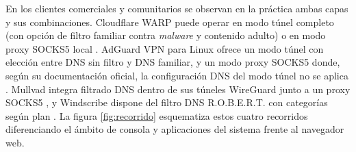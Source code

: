 \documentclass[10pt,a4paper]{article}
\begin{document}
En los clientes comerciales y comunitarios se observan en la práctica ambas capas y sus combinaciones. Cloudflare WARP puede operar en modo túnel completo (con opción de filtro familiar contra \emph{malware} y contenido adulto) o en modo proxy SOCKS5 local \cite{warpcliente,warpmodos}. AdGuard VPN para Linux ofrece un modo túnel con elección entre DNS sin filtro y DNS familiar, y un modo proxy SOCKS5 donde, según su documentación oficial, la configuración DNS del modo túnel no se aplica \cite{adguardvpnlinux}. Mullvad integra filtrado DNS dentro de sus túneles WireGuard junto a un proxy SOCKS5 \cite{mullvaddns,mullvadsocks}, y Windscribe dispone del filtro DNS R.O.B.E.R.T. con categorías según plan \cite{windscribevpn,windscribeplans}. La figura \ref{fig:recorrido} esquematiza estos cuatro recorridos diferenciando el ámbito de consola y aplicaciones del sistema frente al navegador web.
\end{document}
